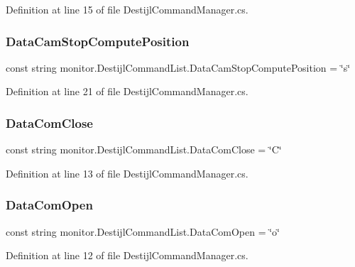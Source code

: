 Definition at line 15 of file Destijl\+Command\+Manager.\+cs.

\mbox{\label{classmonitor_1_1_destijl_command_list_ad09dd921c6c8cf8c7d90a2c0a05d4056}} 
\subsubsection{Data\+Cam\+Stop\+Compute\+Position}
{\footnotesize\ttfamily const string monitor.\+Destijl\+Command\+List.\+Data\+Cam\+Stop\+Compute\+Position = \char`\"{}s\char`\"{}}



Definition at line 21 of file Destijl\+Command\+Manager.\+cs.

\mbox{\label{classmonitor_1_1_destijl_command_list_ad97cbe948c71a4dc3fa95afbf9ca26d8}} 
\subsubsection{Data\+Com\+Close}
{\footnotesize\ttfamily const string monitor.\+Destijl\+Command\+List.\+Data\+Com\+Close = \char`\"{}C\char`\"{}}



Definition at line 13 of file Destijl\+Command\+Manager.\+cs.

\mbox{\label{classmonitor_1_1_destijl_command_list_a1bcde55da429bcf2c04ed6d0621e496f}} 
\subsubsection{Data\+Com\+Open}
{\footnotesize\ttfamily const string monitor.\+Destijl\+Command\+List.\+Data\+Com\+Open = \char`\"{}o\char`\"{}}



Definition at line 12 of file Destijl\+Command\+Manager.\+cs.

